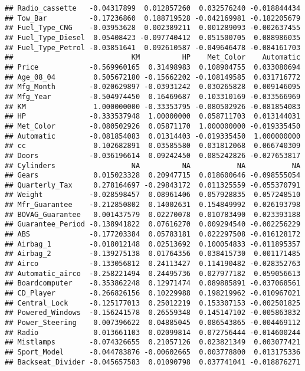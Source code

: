 \documentclass[]{article}
\begin{document}
\begin{verbatim}
## Radio_cassette   -0.04317899  0.012857260  0.032576240 -0.018844434
## Tow_Bar          -0.17236860  0.188719528 -0.042169981 -0.182205679
## Fuel_Type_CNG    -0.03953628  0.002389211  0.001289093 -0.002637455
## Fuel_Type_Diesel  0.05408423 -0.097740412  0.051500705  0.088986035
## Fuel_Type_Petrol -0.03851641  0.092610587 -0.049646478 -0.084161703
##                            KM          HP    Met_Color    Automatic
## Price            -0.569960165  0.31498983  0.108904755  0.033080694
## Age_08_04         0.505672180 -0.15662202 -0.108149585  0.031716772
## Mfg_Month        -0.020629897 -0.03931242  0.030265828  0.009146095
## Mfg_Year         -0.504974450  0.16469687  0.103310169 -0.033566969
## KM                1.000000000 -0.33353795 -0.080502926 -0.081854083
## HP               -0.333537948  1.00000000  0.058711703  0.013144031
## Met_Color        -0.080502926  0.05871170  1.000000000 -0.019335450
## Automatic        -0.081854083  0.01314403 -0.019335450  1.000000000
## cc                0.102682891  0.03585580  0.031812068  0.066740309
## Doors            -0.036196614  0.09242450  0.085242826 -0.027653817
## Cylinders                  NA          NA           NA           NA
## Gears             0.015023328  0.20947715  0.018600646 -0.098555054
## Quarterly_Tax     0.278164697 -0.29843172  0.011325559 -0.055370791
## Weight           -0.028598457  0.08961406  0.057928835  0.057248510
## Mfr_Guarantee    -0.212850802  0.14002631  0.154849992  0.026193798
## BOVAG_Guarantee   0.001437579  0.02270078  0.010783490  0.023393188
## Guarantee_Period -0.138941822  0.07616270  0.009294540 -0.002256229
## ABS              -0.177203384  0.05783181  0.022297508 -0.016128172
## Airbag_1         -0.018012148  0.02513692  0.100054833 -0.011895357
## Airbag_2         -0.139275138  0.01764356  0.038415730  0.001171485
## Airco            -0.133056812  0.24113427  0.114190482 -0.028352763
## Automatic_airco  -0.258221494  0.24495736  0.027977182  0.059056613
## Boardcomputer    -0.353862248  0.12971474  0.089885891 -0.037068561
## CD_Player        -0.266826156  0.10229988  0.198219962 -0.010967021
## Central_Lock     -0.125177013  0.25012219  0.153307153 -0.002501825
## Powered_Windows  -0.156241578  0.26559348  0.145147102 -0.005863832
## Power_Steering    0.007396622  0.04885045  0.086543865 -0.004469112
## Radio             0.013661103  0.02099814  0.072756444 -0.014600244
## Mistlamps        -0.074326655  0.21057126  0.023821349  0.003077421
## Sport_Model      -0.044783876 -0.00602665  0.003778800  0.013175336
## Backseat_Divider -0.045657583  0.01090798  0.037741041 -0.018876271

\end{verbatim}
\end{document}
